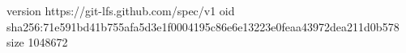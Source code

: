 version https://git-lfs.github.com/spec/v1
oid sha256:71e591bd41b755afa5d3e1f0004195c86e6e13223e0feaa43972dea211d0b578
size 1048672
